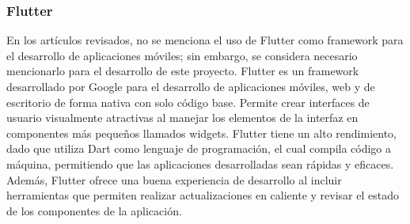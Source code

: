 \subsubsection{Flutter}
En los artículos revisados, no se menciona el uso de Flutter como framework para el desarrollo de aplicaciones móviles;
sin embargo, se considera necesario mencionarlo para el desarrollo de este proyecto. Flutter es un framework desarrollado
por Google para el desarrollo de aplicaciones móviles, web y de escritorio de forma nativa con solo código base. Permite
crear interfaces de usuario visualmente atractivas al manejar los elementos de la interfaz en componentes más pequeños
llamados widgets. Flutter tiene un alto rendimiento, dado que utiliza Dart como lenguaje de programación, el cual compila
código a máquina, permitiendo que las aplicaciones desarrolladas sean rápidas y eficaces. Además, Flutter ofrece una buena
experiencia de desarrollo al incluir herramientas que permiten realizar actualizaciones en caliente y revisar el estado de
los componentes de la aplicación.
